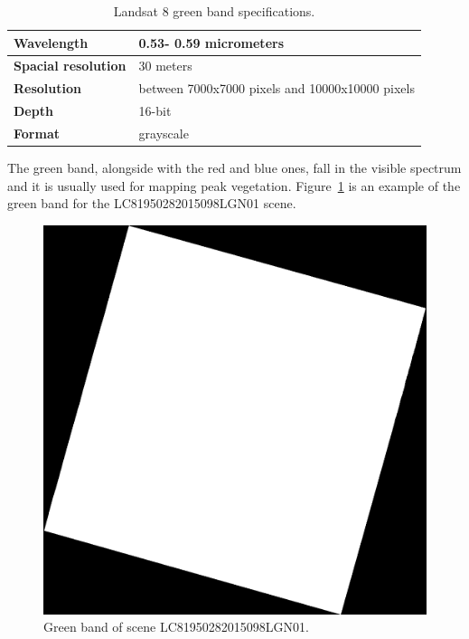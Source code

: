 \documentclass[12pt, a4paper]{report}
\begin{document}
	\begin{table} [h]
		\center
		\begin{tabular} {| l | l |}
			\hline
			\textbf{Wavelength} & {0.53- 0.59 micrometers} \\ [0.2ex]
			\hline
			\textbf{Spacial resolution} & {30 meters} \\ [0.2ex]
			\hline
			\textbf{Resolution} & {between 7000x7000 pixels and 10000x10000 pixels} \\ [0.2ex]
			\hline
			\textbf{Depth} & {16-bit}\\ [0.2ex]
			\hline
			\textbf{Format} & {grayscale}\\ [0.2ex]
			\hline
		\end{tabular}
		\caption{Landsat 8 green band specifications.}
		\label{table:green_table}
	\end{table}
	\par The green band, alongside with the red and blue ones, fall in the visible spectrum and it is usually used for mapping peak vegetation. Figure~\ref{fig:green} is an example of the green band for the LC81950282015098LGN01 scene.
	\begin{figure}[h]
		\centering
		\includegraphics[scale=0.3]{../images/LC81950282015098LGN01_B3.png}
		\caption{Green band of scene LC81950282015098LGN01.}
		\label{fig:green}
	\end{figure}
	
\end{document}
